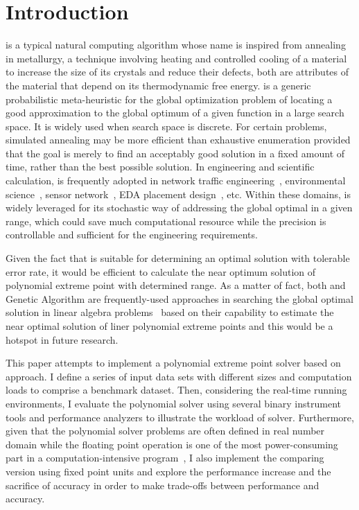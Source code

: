 \section{Introduction}
\label{sec:intro}
\SA is a typical natural computing algorithm whose name is inspired from  annealing in metallurgy, a technique involving heating and controlled cooling of a material to increase the size of its crystals and reduce their defects, both are attributes of the material that depend on its thermodynamic free energy. \SA is a generic probabilistic meta-heuristic for the global optimization problem of locating a good approximation to the global optimum of a given function in a large search space. It is widely used when search space is discrete. For certain problems, simulated annealing may be more efficient than exhaustive enumeration provided that the goal is merely to find an acceptably good solution in a fixed amount of time, rather than the best possible solution. In engineering and scientific calculation, \SA is frequently adopted in network traffic engineering~\cite{Pasias:2004}, environmental science~\cite{Jingwen:2009}, sensor network~\cite{Zimmerman:2007}, EDA placement design~\cite{Naifeng:2011}, etc. Within these domains, \SA is widely leveraged for its stochastic way of addressing the global optimal in a given range, which could save much computational resource while the precision is controllable and sufficient for the engineering requirements.

Given the fact that \SA is suitable for determining an optimal solution with tolerable error rate, it would be efficient to calculate the near optimum solution of polynomial extreme point with determined range. As a matter of fact, both \SA and Genetic Algorithm are frequently-used approaches in searching the global optimal solution in linear algebra problems~\cite{Chen:1998} based on their capability to estimate the near optimal solution of liner polynomial extreme points and this would be a hotspot in future research.

This paper attempts to implement a polynomial extreme point solver based on \SA approach. I define a series of input data sets with different sizes and computation loads to comprise a benchmark dataset. Then, considering the real-time running environments, I evaluate the \SA polynomial solver using several binary instrument tools and performance analyzers to illustrate the workload of \SA solver. Furthermore, given that the polynomial solver problems are often defined in real number domain while the floating point operation is one of the most power-consuming part in a computation-intensive program~\cite{DaiChen:2013}, I also implement the comparing version using fixed point units and explore the performance increase and the sacrifice of accuracy in order to make trade-offs between performance and accuracy.

